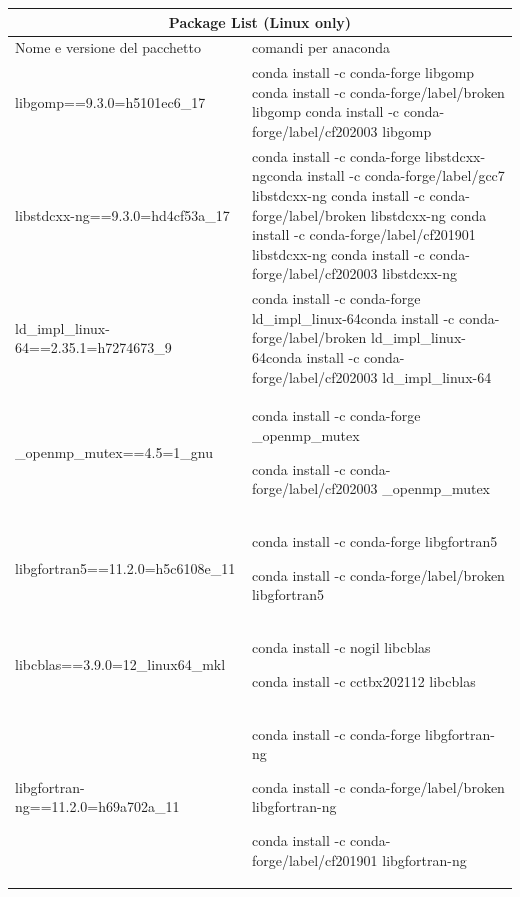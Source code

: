 \begin{tabular}{ |p{8cm}||p{8cm}|  }



\hline
\multicolumn{2}{|c|}{Package List (Linux only)} \\
\hline

Nome e versione del pacchetto& comandi per anaconda\\
\hline

  libgomp==9.3.0=h5101ec6\_17   &	conda install -c conda-forge libgomp\hline
	conda install -c conda-forge/label/broken libgomp \hline
	conda install -c conda-forge/label/cf202003 libgomp\\
\hline


  libstdcxx-ng==9.3.0=hd4cf53a\_17  &	conda install -c conda-forge libstdcxx-ng\hline conda install -c conda-forge/label/gcc7 libstdcxx-ng \hline conda install -c conda-forge/label/broken libstdcxx-ng \hline conda install -c conda-forge/label/cf201901 libstdcxx-ng \hline	conda install -c conda-forge/label/cf202003 libstdcxx-ng\\
\hline


  ld\_impl\_linux-64==2.35.1=h7274673\_9  &	conda install -c conda-forge ld\_impl\_linux-64\hline conda install -c conda-forge/label/broken ld\_impl\_linux-64\hline conda install -c conda-forge/label/cf202003 ld\_impl\_linux-64\\
\hline


  \_openmp\_mutex==4.5=1\_gnu  &	conda install -c conda-forge \_openmp\_mutex\hline

	conda install -c conda-forge/label/cf202003 \_openmp\_mutex\\
\hline

		
  libgfortran5==11.2.0=h5c6108e\_11 &
	conda install -c conda-forge libgfortran5\hline

	conda install -c conda-forge/label/broken libgfortran5\\
\hline


  libcblas==3.9.0=12\_linux64\_mkl &
	conda install -c nogil libcblas\hline

	conda install -c cctbx202112 libcblas\\
\hline


  libgfortran-ng==11.2.0=h69a702a\_11  &
	conda install -c conda-forge libgfortran-ng\hline

	conda install -c conda-forge/label/broken libgfortran-ng\hline

	conda install -c conda-forge/label/cf201901 libgfortran-ng\hline


\end{tabular}
